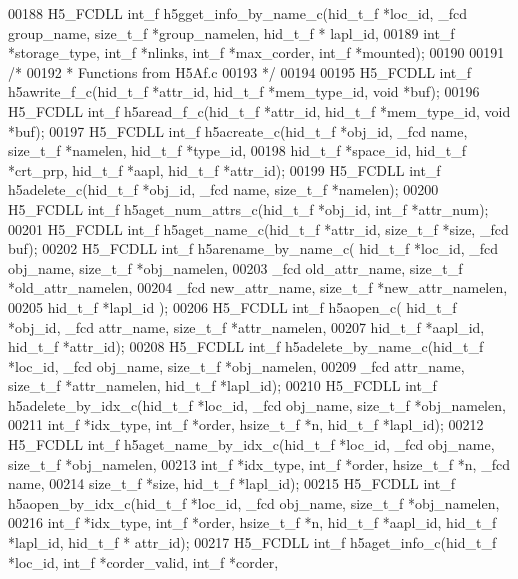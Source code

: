 \begin{DoxyCode}
00188 H5\_FCDLL int\_f h5gget\_info\_by\_name\_c(hid\_t\_f *loc\_id, \_fcd group\_name, size\_t\_f *group\_namelen, hid\_t\_f *
      lapl\_id,
00189                       int\_f *storage\_type, int\_f *nlinks, int\_f *max\_corder, int\_f *mounted);
00190 
00191 \textcolor{comment}{/*}
00192 \textcolor{comment}{ * Functions from H5Af.c}
00193 \textcolor{comment}{ */}
00194 
00195 H5\_FCDLL int\_f h5awrite\_f\_c(hid\_t\_f *attr\_id, hid\_t\_f *mem\_type\_id, \textcolor{keywordtype}{void} *buf);
00196 H5\_FCDLL int\_f h5aread\_f\_c(hid\_t\_f *attr\_id, hid\_t\_f *mem\_type\_id, \textcolor{keywordtype}{void} *buf);
00197 H5\_FCDLL int\_f h5acreate\_c(hid\_t\_f *obj\_id, \_fcd name, size\_t\_f *namelen, hid\_t\_f *type\_id,
00198                         hid\_t\_f *space\_id, hid\_t\_f *crt\_prp, hid\_t\_f *aapl, hid\_t\_f *attr\_id);
00199 H5\_FCDLL int\_f h5adelete\_c(hid\_t\_f *obj\_id, \_fcd name, size\_t\_f *namelen);
00200 H5\_FCDLL int\_f h5aget\_num\_attrs\_c(hid\_t\_f *obj\_id, int\_f *attr\_num);
00201 H5\_FCDLL int\_f h5aget\_name\_c(hid\_t\_f *attr\_id, size\_t\_f *size, \_fcd buf);
00202 H5\_FCDLL int\_f h5arename\_by\_name\_c( hid\_t\_f *loc\_id, \_fcd obj\_name, size\_t\_f *obj\_namelen,
00203                       \_fcd old\_attr\_name, size\_t\_f *old\_attr\_namelen,
00204                       \_fcd new\_attr\_name, size\_t\_f *new\_attr\_namelen,
00205                       hid\_t\_f *lapl\_id );
00206 H5\_FCDLL int\_f h5aopen\_c( hid\_t\_f *obj\_id, \_fcd attr\_name, size\_t\_f *attr\_namelen,
00207                 hid\_t\_f *aapl\_id, hid\_t\_f *attr\_id);
00208 H5\_FCDLL int\_f h5adelete\_by\_name\_c(hid\_t\_f *loc\_id, \_fcd obj\_name, size\_t\_f *obj\_namelen,
00209                      \_fcd attr\_name, size\_t\_f *attr\_namelen, hid\_t\_f *lapl\_id);
00210 H5\_FCDLL int\_f h5adelete\_by\_idx\_c(hid\_t\_f *loc\_id, \_fcd obj\_name, size\_t\_f *obj\_namelen,
00211                     int\_f *idx\_type, int\_f *order, hsize\_t\_f *n, hid\_t\_f *lapl\_id);
00212 H5\_FCDLL int\_f h5aget\_name\_by\_idx\_c(hid\_t\_f *loc\_id, \_fcd obj\_name, size\_t\_f *obj\_namelen,
00213                       int\_f *idx\_type, int\_f *order, hsize\_t\_f *n, \_fcd name,
00214                       size\_t\_f *size, hid\_t\_f *lapl\_id);
00215 H5\_FCDLL int\_f h5aopen\_by\_idx\_c(hid\_t\_f *loc\_id, \_fcd obj\_name, size\_t\_f *obj\_namelen,
00216              int\_f *idx\_type, int\_f *order, hsize\_t\_f *n, hid\_t\_f *aapl\_id, hid\_t\_f *lapl\_id, hid\_t\_f *
      attr\_id);
00217 H5\_FCDLL int\_f h5aget\_info\_c(hid\_t\_f *loc\_id, int\_f *corder\_valid, int\_f *corder,

\end{DoxyCode}
